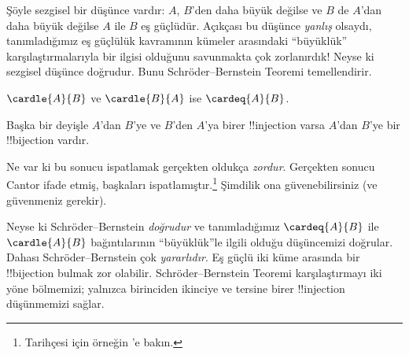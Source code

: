 \documentclass[../../../include/open-logic-section]{subfiles}
\begin{document}


\begin{explain}
Şöyle sezgisel bir düşünce vardır: $A$, $B$'den daha büyük değilse ve $B$ de
$A$'dan daha büyük değilse $A$ ile $B$ eş güçlüdür. Açıkçası bu düşünce
\emph{yanlış} olsaydı, tanımladığımız eş güçlülük kavramının kümeler
arasındaki ``büyüklük'' karşılaştırmalarıyla bir ilgisi olduğunu savunmakta
çok zorlanırdık!{} Neyse ki sezgisel düşünce doğrudur. Bunu
Schr\"oder--Bernstein Teoremi temellendirir.
\end{explain}

\begin{thm}
	$\cardle{A}{B}$ ve $\cardle{B}{A}$ ise $\cardeq{A}{B}$.
\end{thm}

\begin{explain}
Başka bir deyişle $A$'dan $B$'ye ve $B$'den $A$'ya birer !!{injection}
varsa $A$'dan $B$'ye bir !!{bijection} vardır.

Ne var ki bu sonucu ispatlamak gerçekten oldukça \emph{zordur}. Gerçekten
sonucu Cantor ifade etmiş, başkaları ispatlamıştır.\footnote{Tarihçesi için
örneğin \citet[pp.~165--6]{Potter2004}'e bakın.}
%
Şimdilik ona güvenebilirsiniz (ve güvenmeniz gerekir).

Neyse ki Schr\"oder--Bernstein \emph{doğrudur} ve tanımladığımız
$\cardeq{A}{B}$ ile $\cardle{A}{B}$ bağıntılarının ``büyüklük''le ilgili
olduğu düşüncemizi doğrular. Dahası Schr\"oder--Bernstein çok
\emph{yararlıdır}. Eş güçlü iki küme arasında bir !!{bijection} bulmak zor
olabilir. Schr\"oder--Bernstein Teoremi karşılaştırmayı iki yöne bölmemizi;
yalnızca birinciden ikinciye ve tersine birer !!{injection} düşünmemizi sağlar.
\end{explain}
\end{document}
